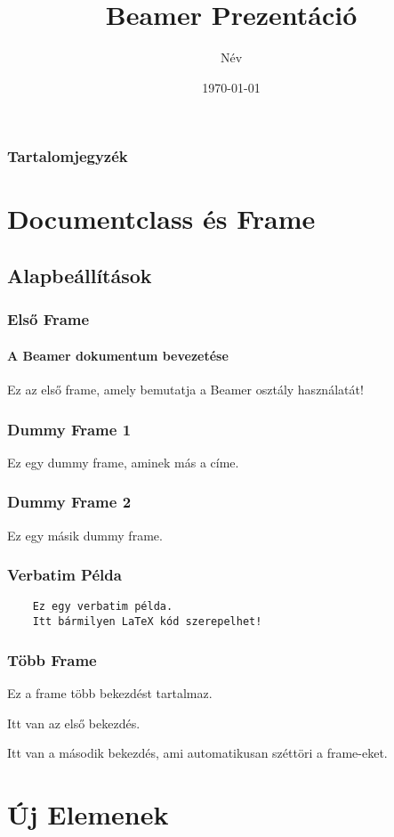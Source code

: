 \documentclass[12pt,16:9]{beamer}
\title{Beamer Prezentáció}
\author{Név}
\date{\today}
\begin{document}
\begin{frame}
    \titlepage
\end{frame}

\begin{frame}
    \frametitle{Tartalomjegyzék}
    \tableofcontents
\end{frame}

\section{Documentclass és Frame}

\subsection{Alapbeállítások}
\begin{frame}
    \frametitle{Első Frame}
    \framesubtitle{A Beamer dokumentum bevezetése}
    Ez az első frame, amely bemutatja a Beamer osztály használatát!
\end{frame}

\begin{frame}
    \frametitle{Dummy Frame 1}
    Ez egy dummy frame, aminek más a címe.
\end{frame}

\begin{frame}
    \frametitle{Dummy Frame 2}
    Ez egy másik dummy frame.
\end{frame}

\begin{frame}[fragile] %
    \frametitle{Verbatim Példa}
    \begin{verbatim}
    Ez egy verbatim példa.
    Itt bármilyen LaTeX kód szerepelhet!
    \end{verbatim}
\end{frame}

\begin{frame}[allowframebreaks]
    \frametitle{Több Frame}
    Ez a frame több bekezdést tartalmaz.

    Itt van az első bekezdés.
    
    \framebreak
    
    Itt van a második bekezdés, ami automatikusan széttöri a frame-eket.
\end{frame}

\section{Új Elemenek}
\end{document}
